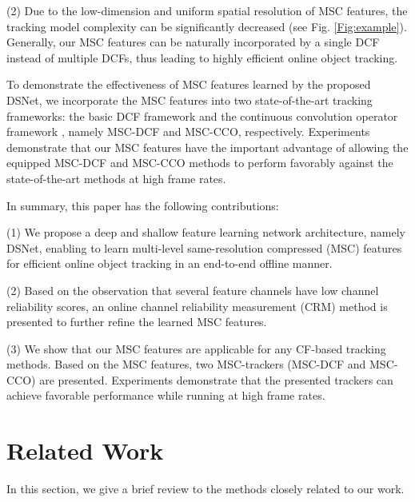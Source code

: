 \documentclass[runningheads]{llncs}
\begin{document}
(2) Due to the low-dimension and uniform spatial resolution of MSC features, the tracking model complexity can be significantly decreased (see Fig. \ref{Fig:example}). Generally, our MSC features can be naturally incorporated by a single DCF instead of multiple DCFs, thus leading to highly efficient online object tracking.




To demonstrate the effectiveness of MSC features learned by the proposed DSNet, we incorporate the MSC features into two state-of-the-art tracking frameworks: the basic DCF framework \cite{KCF} and the continuous convolution operator framework \cite{CCOT}, namely MSC-DCF and MSC-CCO, respectively. Experiments demonstrate that our MSC features have the important advantage of allowing the equipped MSC-DCF and MSC-CCO methods to perform favorably against the state-of-the-art methods at high frame rates.


In summary, this paper has the following contributions:

(1) We propose a deep and shallow feature learning network architecture, namely DSNet, enabling to learn multi-level same-resolution compressed (MSC) features for efficient online object tracking in an end-to-end offline manner.

(2) Based on the observation that several feature channels have low channel reliability scores, an online channel reliability measurement (CRM) method is presented to further refine the learned MSC features.


(3) We show that our MSC features are applicable for any CF-based tracking methods. Based on the MSC features, two MSC-trackers (MSC-DCF and MSC-CCO) are presented. Experiments demonstrate that the presented trackers can achieve favorable performance while running at high frame rates. 


\section{Related Work}
In this section, we give a brief review to the methods closely related to our work.\\
\end{document}
